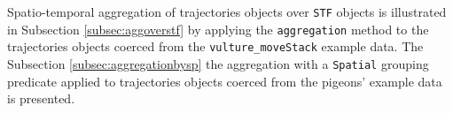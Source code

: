 \documentclass[12pt, oneside, a4paper]{scrbook}
\newcommand{\pkg}[1]{{\normalfont\fontseries{b}\selectfont #1}}
\let\code=\texttt
\begin{document}
Spatio-temporal aggregation of \pkg{trajectories} objects over \code{STF} objects is illustrated in Subsection \ref{subsec:aggoverstf} by applying the \code{aggregation} method to the \pkg{trajectories} objects coerced from the \code{vulture\_moveStack} example data.
The Subsection \ref{subsec:aggregationbysp} the aggregation with a \code{Spatial} grouping predicate applied to \pkg{trajectories} objects coerced from the pigeons' example data is presented.
\par\medskip





\end{document}
